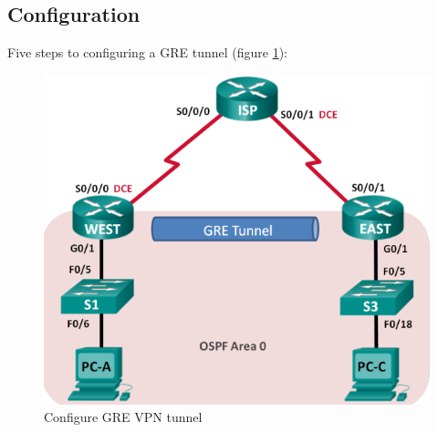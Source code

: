 \subsection{Configuration}

Five steps to configuring a GRE tunnel (figure \ref{GREexample}):

\begin{figure}[hbtp]
\caption{Configure GRE VPN tunnel}\label{GREexample}
\centering
\includegraphics[scale=0.5]{pictures/GREexample.PNG}
\end{figure}

